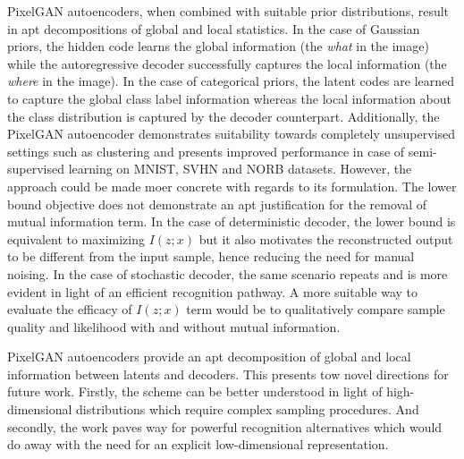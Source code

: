 \documentclass[11pt,letterpaper]{article}
\begin{document}
PixelGAN autoencoders, when combined with suitable prior distributions, result in apt decompositions of global and local statistics. In the case of Gaussian priors, the hidden code learns the global information (the \textit{what} in the image) while the autoregressive decoder successfully captures the local information (the \textit{where} in the image). In the case of categorical priors, the latent codes are learned to capture the global class label information whereas the local information about the class distribution is captured by the decoder counterpart. Additionally, the PixelGAN autoencoder demonstrates suitability towards completely unsupervised settings such as clustering and presents improved performance in case of semi-supervised learning on MNIST, SVHN and NORB datasets. However, the approach could be made moer concrete with regards to its formulation. The lower bound objective does not demonstrate an apt justification for the removal of mutual information term. In the case of deterministic decoder, the lower bound is equivalent to maximizing $I(z;x)$ but it also motivates the reconstructed output to be different from the input sample, hence reducing the need for manual noising. In the case of stochastic decoder, the same scenario repeats and is more evident in light of an efficient recognition pathway. A more suitable way to evaluate the efficacy of $I(z;x)$ term would be to qualitatively compare sample quality and likelihood with and without mutual information.

PixelGAN autoencoders provide an apt decomposition of global and local information between latents and decoders. This presents tow novel directions for future work. Firstly, the scheme can be better understood in light of high-dimensional distributions which require complex sampling procedures. And secondly, the work paves way for powerful recognition alternatives which would do away with the need for an explicit low-dimensional representation. 
\end{document}
